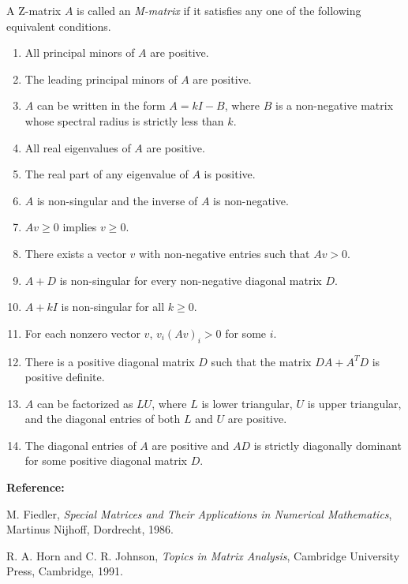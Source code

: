 \documentclass[12pt]{article}
\begin{document}
A Z-matrix $A$ is called an \emph{M-matrix} if it satisfies any one of
the following equivalent conditions.


\begin{enumerate}

\item All principal minors of $A$ are positive.

\item The leading principal minors of $A$ are positive.

\item $A$ can be written in the form $A=kI-B$, where $B$ is a
non-negative matrix whose spectral radius is strictly less than
$k$.

\item All real eigenvalues of $A$ are positive.

\item The real part of any eigenvalue of $A$ is positive.

\item $A$ is non-singular and the inverse of $A$ is non-negative.

\item $Av \geq 0 $ implies $v\geq 0$.

\item There exists a vector $v$ with non-negative entries such
that $Av > 0$.

\item $A+D$ is non-singular for every non-negative diagonal matrix
$D$.

\item $A+kI$ is non-singular for all $k\geq 0$.

\item For each nonzero vector $v$, $v_i (Av)_i>0$ for some $i$.

\item There is a positive diagonal matrix $D$ such that the matrix
$DA + A^TD$ is positive definite.

\item $A$ can be factorized as $LU$, where $L$ is lower
triangular, $U$ is upper triangular, and the diagonal entries of
both $L$ and $U$ are positive.

\item The diagonal entries of $A$ are positive and $AD$ is
strictly diagonally dominant for some positive diagonal matrix
$D$.
\end{enumerate}


{\bf Reference:}


M. Fiedler, {\it Special Matrices and Their Applications in
Numerical Mathematics}, Martinus Nijhoff, Dordrecht, 1986.

R. A. Horn and C. R. Johnson, {\it Topics in Matrix Analysis},
Cambridge University Press, Cambridge, 1991.
\end{document}
